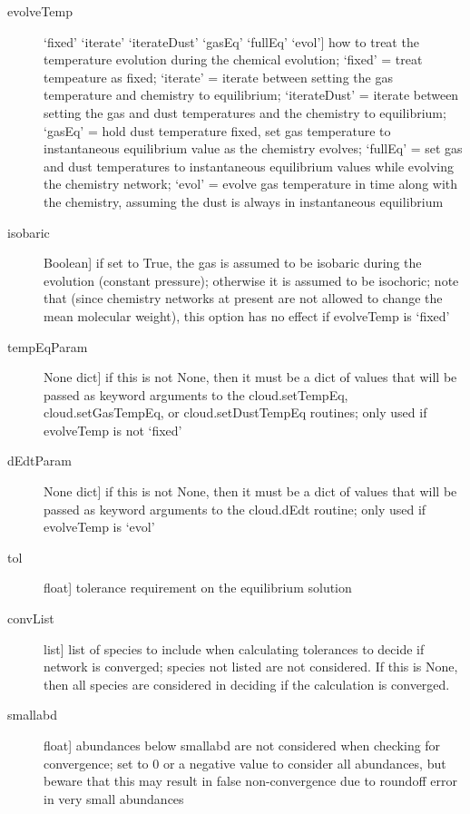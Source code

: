 \documentclass[letterpaper,10pt,english]{sphinxmanual}
\begin{document}
\begin{fulllineitems}
\begin{fulllineitems}
\begin{description}
\begin{description}
\item[{evolveTemp}] \leavevmode{[}`fixed' \textbar{} `iterate' \textbar{} `iterateDust' \textbar{} `gasEq' \textbar{} `fullEq' \textbar{} `evol'{]}
how to treat the temperature evolution during the chemical
evolution; `fixed' = treat tempeature as fixed; `iterate' =
iterate between setting the gas temperature and chemistry to
equilibrium; `iterateDust' = iterate between setting the gas
and dust temperatures and the chemistry to equilibrium;
`gasEq' = hold dust temperature fixed, set gas temperature to
instantaneous equilibrium value as the chemistry evolves;
`fullEq' = set gas and dust temperatures to instantaneous
equilibrium values while evolving the chemistry network;
`evol' = evolve gas temperature in time along with the
chemistry, assuming the dust is always in instantaneous
equilibrium

\item[{isobaric}] \leavevmode{[}Boolean{]}
if set to True, the gas is assumed to be isobaric during
the evolution (constant pressure); otherwise it is assumed
to be isochoric; note that (since chemistry networks at
present are not allowed to change the mean molecular
weight), this option has no effect if evolveTemp is `fixed'

\item[{tempEqParam}] \leavevmode{[}None \textbar{} dict{]}
if this is not None, then it must be a dict of values that
will be passed as keyword arguments to the cloud.setTempEq,
cloud.setGasTempEq, or cloud.setDustTempEq routines; only
used if evolveTemp is not `fixed'

\item[{dEdtParam}] \leavevmode{[}None \textbar{} dict{]}
if this is not None, then it must be a dict of values that
will be passed as keyword arguments to the cloud.dEdt
routine; only used if evolveTemp is `evol'

\item[{tol}] \leavevmode{[}float{]}
tolerance requirement on the equilibrium solution

\item[{convList}] \leavevmode{[}list{]}
list of species to include when calculating tolerances to
decide if network is converged; species not listed are not
considered. If this is None, then all species are considered
in deciding if the calculation is converged.

\item[{smallabd}] \leavevmode{[}float{]}
abundances below smallabd are not considered when checking for
convergence; set to 0 or a negative value to consider all
abundances, but beware that this may result in false
non-convergence due to roundoff error in very small abundances


\end{description}
\end{description}
\end{fulllineitems}
\end{fulllineitems}
\end{document}
